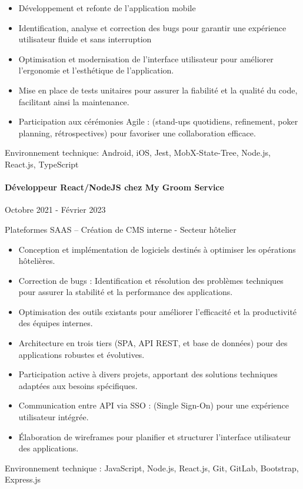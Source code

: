\documentclass{article}
\begin{document}
\raggedright  
\begin{itemize}
  \item{Développement et refonte de l’application mobile}
  \item{Identification, analyse et correction des bugs pour garantir une expérience utilisateur fluide et
    sans interruption}
  \item{Optimisation et modernisation de l'interface utilisateur pour améliorer l'ergonomie et l'esthétique
    de l'application.}
  \item{Mise en place de tests unitaires pour assurer la fiabilité et la qualité du code, facilitant ainsi la
    maintenance.}
  \item{Participation aux cérémonies Agile : (stand-ups quotidiens, refinement, poker planning, rétrospectives) pour
    favoriser une collaboration efficace.}
\end{itemize}
\noindent
Environnement technique: Android, iOS, Jest, MobX-State-Tree, Node.js, React.js, TypeScript
\paragraph{Développeur React/NodeJS chez My Groom Service}\hspace*{\fill}Octobre 2021 - Février 2023

\noindent
Plateformes SAAS – Création de CMS interne - Secteur hôtelier \\

\raggedright
\begin{itemize}
  \item{Conception et implémentation de logiciels destinés à optimiser les opérations hôtelières.}
  \item{Correction de bugs : Identification et résolution des problèmes techniques pour assurer la stabilité
    et la performance des applications.}
  \item{Optimisation des outils existants pour améliorer l'efficacité et la productivité des équipes internes.}
  \item{Architecture en trois tiers (SPA, API REST, et base de données) pour des applications robustes
    et évolutives.}
  \item{Participation active à divers projets, apportant des solutions techniques adaptées aux besoins
spécifiques.}
  \item{Communication entre API via SSO : (Single Sign-On) pour une expérience utilisateur intégrée.}
  \item{Élaboration de wireframes pour planifier et structurer l'interface utilisateur des applications.}
\end{itemize}
\noindent
Environnement technique : JavaScript, Node.js, React.js, Git, GitLab, Bootstrap, Express.js
\end{document}
